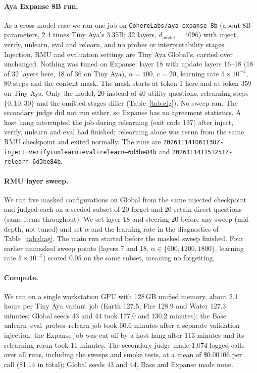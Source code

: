 \documentclass[10pt,twocolumn]{article}
\newcommand{\code}[1]{\texttt{#1}}
\begin{document}
\paragraph{Aya Expanse 8B run.} As a cross-model case we ran one job on \code{CohereLabs/\allowbreak aya-expanse-8b} (about 8B parameters, 2.4 times Tiny Aya's 3.35B; 32 layers, $d_\text{model}=4096$) with inject, verify, unlearn, eval and relearn, and no probes or interpretability stages. Injection, RMU and evaluation settings are Tiny Aya Global's, carried over unchanged. Nothing was tuned on Expanse: layer 18 with update layers 16--18 (18 of 32 layers here, 18 of 36 on Tiny Aya), $\alpha=100$, $c=20$, learning rate $5\times10^{-4}$, 80 steps and the content mask. The mask starts at token 1 here and at token 359 on Tiny Aya. Only the model, 20 instead of 40 utility questions, relearning steps $\{0,10,30\}$ and the omitted stages differ (Table~\ref{tab:cfg}). No sweep ran. The secondary judge did not run either, so Expanse has no agreement statistics. A host hang interrupted the job during relearning (exit code 137) after inject, verify, unlearn and eval had finished; relearning alone was rerun from the same RMU checkpoint and exited normally. The runs are \code{20261114T061138Z-\allowbreak inject+verify+unlearn+\allowbreak eval+relearn--6d3be84b} and \code{20261114T151251Z-\allowbreak relearn-6d3be84b}.

\paragraph{RMU layer sweep.} We ran five masked configurations on Global from the same injected checkpoint and judged each on a seeded subset of 20 forget and 20 retain direct questions (same items throughout). We set layer 18 and steering 20 before any sweep (mid-depth, not tuned) and set $\alpha$ and the learning rate in the diagnostics of Table~\ref{tab:diag}. The main run started before the masked sweep finished. Four earlier unmasked sweep points (layers 7 and 18, $\alpha\in\{600,1200,1800\}$, learning rate $5\times10^{-5}$) scored 0.05 on the same subset, meaning no forgetting.

\paragraph{Compute.} We ran on a single workstation GPU with 128\,GB unified memory, about 2.1 hours per Tiny Aya variant job (Earth 127.5, Fire 128.9 and Water 127.3 minutes; Global seeds 43 and 44 took 177.0 and 130.2 minutes); the Base unlearn--eval--probes--relearn job took 60.6 minutes after a separate validation injection; the Expanse job was cut off by a host hang after 113 minutes and its relearning rerun took 11 minutes. The secondary judge made 1{,}074 logged calls over all runs, including the sweeps and smoke tests, at a mean of \$0.00106 per call (\$1.14 in total); Global seeds 43 and 44, Base and Expanse made none.
\end{document}
